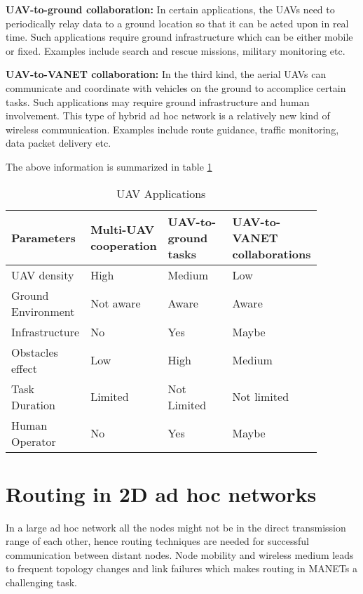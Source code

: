 \textbf{UAV-to-ground collaboration:} In certain applications, the UAVs need to periodically relay data to a ground location so that it can be acted upon in real time. Such applications require ground infrastructure which can be either mobile or fixed. Examples include search and rescue missions, military monitoring etc.

\textbf{UAV-to-VANET collaboration:} In the third kind, the aerial UAVs can communicate and coordinate with vehicles on the ground to accomplice certain tasks. Such applications may require ground infrastructure and human involvement. This type of hybrid ad hoc network is a relatively new kind of wireless communication. Examples include route guidance, traffic monitoring, data packet delivery etc.

The above information is summarized in table \ref{tab:uav_applications}

\begin{table}
\caption{UAV Applications}
\label{tab:uav_applications}
\begin{tabular}{|p{0.22\linewidth}|p{0.22\linewidth}|p{0.22\linewidth}|p{0.22\linewidth}|}
\toprule
Parameters & Multi-UAV cooperation & UAV-to-ground tasks & UAV-to-VANET collaborations\\
\midrule
UAV density & High & Medium & Low\\
\midrule
Ground Environment 	& Not aware &  Aware & Aware  \\
\midrule
Infrastructure & No & Yes &  Maybe \\
\midrule
Obstacles effect & Low & High & Medium \\
\midrule
Task Duration & Limited & Not Limited & Not limited \\
\midrule
Human Operator & No & Yes & Maybe \\
\bottomrule
\end{tabular}
\end{table}

\section{Routing in 2D ad hoc networks}

In a large ad hoc network all the nodes might not be in the direct transmission range of each other, hence routing techniques are needed for successful communication between distant nodes. Node mobility and wireless medium leads to frequent topology changes and link failures which makes routing in MANETs a challenging task.

